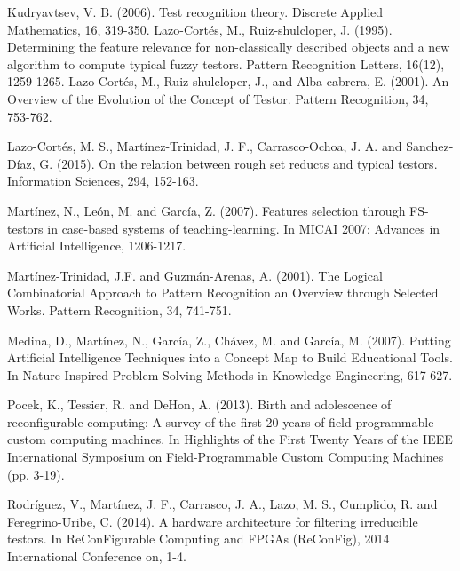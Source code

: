 \documentclass[authoryear,preprint,review,12pt]{elsarticle}
\begin{document}
\begin{thebibliography}{00}
Kudryavtsev, V. B. (2006). Test recognition theory. Discrete Applied Mathematics, 16, 319-350.
Lazo-Cort\'es, M., Ruiz-shulcloper, J. (1995). Determining the feature relevance for non-classically described objects and a new algorithm to compute typical fuzzy testors. Pattern Recognition Letters, 16(12), 1259-1265.
Lazo-Cort\'es, M., Ruiz-shulcloper, J., and Alba-cabrera, E. (2001). An Overview of the Evolution of the Concept of Testor. Pattern Recognition, 34, 753-762.

Lazo-Cortés, M. S., Mart\'inez-Trinidad, J. F., Carrasco-Ochoa, J. A. and Sanchez-D\'iaz, G. (2015). On the relation between rough set reducts and typical testors. Information Sciences, 294, 152-163.

Mart\'inez, N., Le\'on, M. and Garc\'ia, Z. (2007). Features selection through FS-testors in case-based systems of teaching-learning. In MICAI 2007: Advances in Artificial Intelligence, 1206-1217.

Mart\'inez-Trinidad, J.F. and Guzm\'an-Arenas, A. (2001). The Logical Combinatorial Approach to Pattern Recognition an Overview through Selected Works. Pattern Recognition, 34, 741-751.

Medina, D., Mart\'inez, N., Garc\'ia, Z., Ch\'avez, M. and Garc\'ia, M. (2007). Putting Artificial Intelligence Techniques into a Concept Map to Build Educational Tools. In Nature Inspired Problem-Solving Methods in Knowledge Engineering, 617-627.

Pocek, K., Tessier, R. and DeHon, A. (2013). Birth and adolescence of reconfigurable computing: A survey of the first 20 years of field-programmable custom computing machines. In Highlights of the First Twenty Years of the IEEE International Symposium on Field-Programmable Custom Computing Machines (pp. 3-19).

 Rodr\'iguez, V., Mart\'inez, J. F., Carrasco, J. A., Lazo, M. S., Cumplido, R. and Feregrino-Uribe, C. (2014). A hardware architecture for filtering irreducible testors. In ReConFigurable Computing and FPGAs (ReConFig), 2014 International Conference on, 1-4.


\end{thebibliography}
\end{document}

